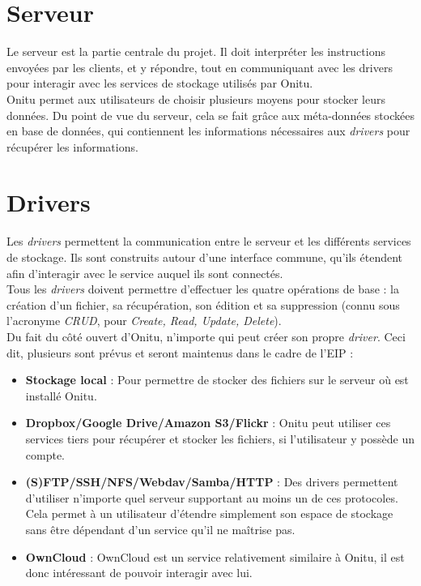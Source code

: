 \section{Serveur}
Le serveur est la partie centrale du projet. Il doit interpréter les instructions envoyées par les clients, et y répondre, tout en communiquant avec les drivers pour interagir avec les services de stockage utilisés par Onitu.\\

Onitu permet aux utilisateurs de choisir plusieurs moyens pour stocker leurs données. Du point de vue du serveur, cela se fait grâce aux méta-données stockées en base de données, qui contiennent les informations nécessaires aux \textit{drivers} pour récupérer les informations.\\

\section{Drivers}
Les \textit{drivers} permettent la communication entre le serveur et les différents services de stockage. Ils sont construits autour d'une interface commune, qu'ils étendent afin d'interagir avec le service auquel ils sont connectés.\\

Tous les \textit{drivers} doivent permettre d'effectuer les quatre opérations de base : la création d'un fichier, sa récupération, son édition et sa suppression (connu sous l'acronyme \textit{CRUD}, pour \textit{Create, Read, Update, Delete}).\\

Du fait du côté ouvert d'Onitu, n'importe qui peut créer son propre \textit{driver}. Ceci dit, plusieurs sont prévus et seront maintenus dans le cadre de l'EIP :
\begin{itemize}
\renewcommand{\labelitemi}{$\bullet$}
    \item \textbf{Stockage local} : Pour permettre de stocker des fichiers sur le serveur où est installé Onitu.
    \item \textbf{Dropbox/Google Drive/Amazon S3/Flickr} : Onitu peut utiliser ces services tiers pour récupérer et stocker les fichiers, si l'utilisateur y possède un compte.
    \item \textbf{(S)FTP/SSH/NFS/Webdav/Samba/HTTP} : Des drivers permettent d'utiliser n'importe quel serveur supportant au moins un de ces protocoles. Cela permet à un utilisateur d'étendre simplement son espace de stockage sans être dépendant d'un service qu'il ne maîtrise pas.
    \item \textbf{OwnCloud} : OwnCloud est un service relativement similaire à Onitu, il est donc intéressant de pouvoir interagir avec lui.
\end{itemize}

